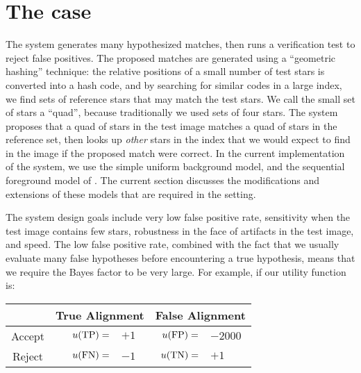 \section{The \an case}
\label{sec:an}


The \an system generates many hypothesized matches, then runs a
verification test to reject false positives.  The proposed matches are
generated using a ``geometric hashing'' technique: the relative
positions of a small number of test stars is converted into a hash
code, and by searching for similar codes in a large index, we find
sets of reference stars that may match the test stars.  We call the
small set of stars a ``quad'', because traditionally we used sets of
four stars. The \an system proposes that a quad of stars in the test
image matches a quad of stars in the reference set, then looks up
\emph{other} stars in the index that we would expect to find in the
image if the proposed match were correct.  In the current
implementation of the \an system, we use the simple uniform background
model, and the sequential foreground model of .  The
current section discusses the modifications and extensions of these
models that are required in the \an setting.


The \an system design goals include very low false positive rate,
sensitivity when the test image contains few stars, robustness in the
face of artifacts in the test image, and speed.  The low false
positive rate, combined with the fact that we usually evaluate many
false hypotheses before encountering a true hypothesis, means that we
require the Bayes factor to be very large.  For example, if our
utility function is:

\nonumberparagraphs

\begin{center}
  \newcommand{\spacer}{\hspace{0.7em}}
\centering
\begin{tabular}{|c|r@{$\ $}l|r@{$\ $}l|}
  \cline{2-5}
  \multicolumn{1}{c|}{} & \multicolumn{2}{c|}{True Alignment} & \multicolumn{2}{c|}{False Alignment \tstrut} \\
  \hline
  Accept & \spacer $u(\mathrm{TP}) =$ & $+1$ & \spacer $u(\mathrm{FP}) =$ & $-2000$ \tstrut \\
  \hline
  Reject & $u(\mathrm{FN}) =$ & $-1$ & $u(\mathrm{TN}) =$ & $+1$ \tstrut \\
  \hline
\end{tabular}
\end{center}

